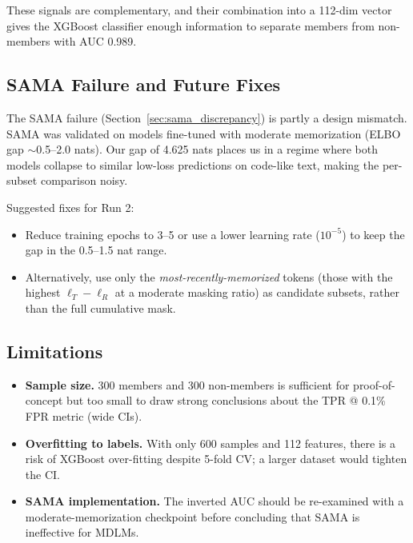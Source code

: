 \documentclass[11pt,a4paper]{article}
\begin{document}
These signals are complementary, and their combination into a 112-dim vector
gives the XGBoost classifier enough information to separate members from
non-members with AUC 0.989.

\subsection{SAMA Failure and Future Fixes}

The SAMA failure (Section~\ref{sec:sama_discrepancy}) is partly a design
mismatch.  SAMA was validated on models fine-tuned with moderate memorization
(ELBO gap $\sim$0.5--2.0 nats).  Our gap of 4.625 nats places us in a regime
where both models collapse to similar low-loss predictions on code-like text,
making the per-subset comparison noisy.

Suggested fixes for Run 2:
\begin{itemize}
  \item Reduce training epochs to 3--5 or use a lower learning rate
        ($10^{-5}$) to keep the gap in the 0.5--1.5 nat range.
  \item Alternatively, use only the \emph{most-recently-memorized} tokens
        (those with the highest $\ell_T - \ell_R$ at a moderate masking
        ratio) as candidate subsets, rather than the full cumulative mask.
\end{itemize}

\subsection{Limitations}

\begin{itemize}
  \item \textbf{Sample size.}  300 members and 300 non-members is sufficient
        for proof-of-concept but too small to draw strong conclusions about
        the TPR @ 0.1\% FPR metric (wide CIs).
  \item \textbf{Overfitting to labels.}  With only 600 samples and 112
        features, there is a risk of XGBoost over-fitting despite 5-fold CV;
        a larger dataset would tighten the CI.
  \item \textbf{SAMA implementation.}  The inverted AUC should be re-examined
        with a moderate-memorization checkpoint before concluding that SAMA
        is ineffective for MDLMs.
\end{itemize}

\end{document}
